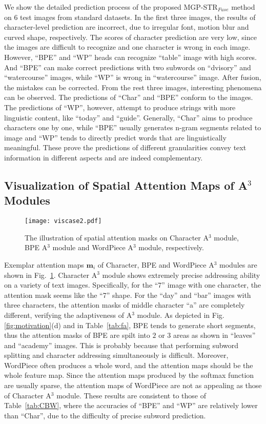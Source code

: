 \documentclass[runningheads]{llncs}
\begin{document}
We show the detailed prediction process of the proposed MGP-STR$_{Fuse}$ method on $6$ test images from standard datasets. In the first three images, the results of character-level prediction are incorrect, due to irregular font, motion blur and curved shape, respectively. The scores of character prediction are very low, since the images are difficult to recognize and one character is wrong in each image. However, ``BPE'' and ``WP'' heads can recognize ``table'' image with high scores. And ``BPE'' can make correct predictions with two subwords on ``dvisory'' and ``watercourse'' images, while ``WP''  is wrong in ``watercourse'' image. After fusion, the mistakes can be corrected. From the rest three images, interesting phenomena can be observed. The predictions of ``Char'' and ``BPE''  conform to the images. The predictions of ``WP'', however, attempt to produce strings with more linguistic content, like ``today'' and ``guide''.
Generally, ``Char'' aims to produce characters one by one, while ``BPE'' usually generates n-gram segments related to image and ``WP'' tends to directly predict words that are linguistically meaningful. These prove the predictions of different granularities convey text information in different aspects and are indeed complementary.

\subsection{Visualization of Spatial Attention Maps of A$^3$ Modules} 

\begin{figure}[t]\centering
 \texttt{[image: viscase2.pdf]}
 \caption{The illustration of spatial attention masks on Character A$^3$  module, BPE A$^3$  module and WordPiece A$^3$  module, respectively. }
 \label{fig:viscase}
\end{figure}

Exemplar attention maps $ \mathbf{m}_i $ of Character, BPE and WordPiece A$^3$ modules are shown in Fig.~\ref{fig:viscase}.
Character A$^3$ module shows extremely precise addressing ability on a variety of text images.
Specifically, for the ``7'' image with one character, the attention mask seems like the ``7'' shape.
For the ``day'' and ``bar'' images with three characters, the attention masks of middle character ``a'' are  completely different, verifying the adaptiveness of A$^3$ module.
As depicted in Fig.\ref{fig:motivation}(d) and in Table~\ref{tab:fa}, BPE tends to generate short segments, thus the attention masks of BPE are spilt into $2$ or $3$ areas as shown in ``leaves'' and ``academy'' images.
This is probably because that performing subword splitting and character addressing simultaneously is difficult.
Moreover, WordPiece often produces a whole word, and the attention maps should be the whole feature map. Since the attention maps produced by the softmax function are usually sparse, the attention maps of WordPiece are not as appealing as those of Character A$^3$ module.
These results are consistent to those of Table~\ref{tab:CBW}, where the accuracies of ``BPE'' and ``WP'' are relatively lower than ``Char'', due to the difficulty of precise subword prediction. 
\end{document}
